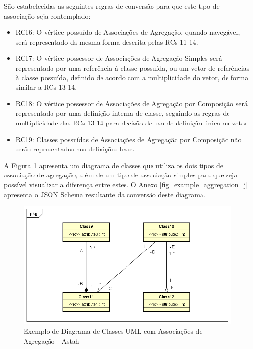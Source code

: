 São estabelecidas as seguintes regras de conversão para que este tipo de associação seja contemplado:

\begin{itemize}
    \item RC16: O vértice possuído de Associações de Agregação, quando navegável, será representado da mesma forma descrita pelas RCs 11-14.

    \item RC17: O vértice possessor de Associações de Agregação Simples será representado por uma referência à classe possuída, ou um vetor de referências à classe possuída, definido de acordo com a multiplicidade do vetor, de forma similar a RCs 13-14.

    \item RC18: O vértice possessor de Associações de Agregação por Composição será representado por uma definição interna de classe, seguindo as regras de multiplicidade das RCs 13-14 para decisão de uso de definição única ou vetor.

    \item RC19: Classes possuídas de Associações de Agregação por Composição não serão representadas nas definições base.
\end{itemize}

A Figura \ref{fig_example_aggregation} apresenta um diagrama de classes que utiliza os dois tipos de associação de agregação, além de um tipo de associação simples para que seja possível visualizar a diferença entre estes. O Anexo \ref{fig_example_aggregation_j} apresenta o JSON Schema resultante da conversão deste diagrama.

\begin{figure}
    \begin{center}
        \includegraphics[scale=0.7]{imagens/Example_Aggregation.png}
    \end{center}
	\caption{\label{fig_example_aggregation}Exemplo de Diagrama de Classes UML com Associações de Agregação - Astah}
\end{figure}

